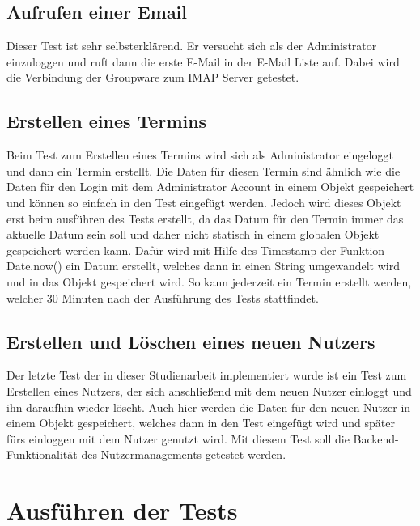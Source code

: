 \subsection{Aufrufen einer Email}

Dieser Test ist sehr selbsterklärend.
Er versucht sich als der Administrator einzuloggen und ruft dann die erste E-Mail in der E-Mail Liste auf.
Dabei wird die Verbindung der Groupware zum IMAP Server getestet.

\subsection{Erstellen eines Termins}

Beim Test zum Erstellen eines Termins wird sich als Administrator eingeloggt und dann ein Termin erstellt.
Die Daten für diesen Termin sind ähnlich wie die Daten für den Login mit dem Administrator Account in einem Objekt gespeichert und können so einfach in den Test eingefügt werden.
Jedoch wird dieses Objekt erst beim ausführen des Tests erstellt, da das Datum für den Termin immer das aktuelle Datum sein soll und daher nicht statisch in einem globalen Objekt gespeichert werden kann.
Dafür wird mit  Hilfe des Timestamp der Funktion Date.now() ein Datum erstellt, welches dann in einen String umgewandelt wird und in das Objekt gespeichert wird.
So kann jederzeit ein Termin erstellt werden, welcher 30 Minuten nach der Ausführung des Tests stattfindet.

\subsection{Erstellen und Löschen eines neuen Nutzers}

Der letzte Test der in dieser Studienarbeit implementiert wurde ist ein Test zum Erstellen eines Nutzers, der sich anschließend mit dem neuen Nutzer einloggt und ihn daraufhin wieder löscht.
Auch hier werden die Daten für den neuen Nutzer in einem Objekt gespeichert, welches dann in den Test eingefügt wird und später fürs einloggen mit dem Nutzer genutzt wird.
Mit diesem Test soll die Backend-Funktionalität des Nutzermanagements getestet werden.

\section{Ausführen der Tests}

